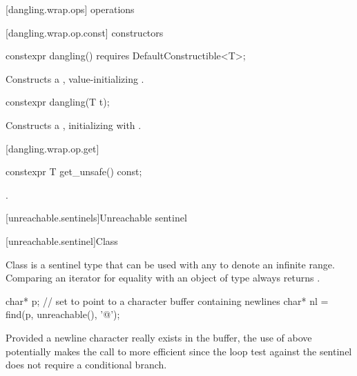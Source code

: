 [dangling.wrap.ops]{ operations}

[dangling.wrap.op.const]{ constructors}

%
\begin{itemdecl}
constexpr dangling() requires DefaultConstructible<T>;
\end{itemdecl}

\begin{itemdescr}
\pnum
\effects Constructs a , value-initializing .
\end{itemdescr}

%
\begin{itemdecl}
constexpr dangling(T t);
\end{itemdecl}

\begin{itemdescr}
\pnum
\effects Constructs a , initializing  with .
\end{itemdescr}

[dangling.wrap.op.get]{}

%
%
\begin{itemdecl}
constexpr T get_unsafe() const;
\end{itemdecl}

\begin{itemdescr}
\pnum
\returns {}.
\end{itemdescr}

[unreachable.sentinels]{Unreachable sentinel}

[unreachable.sentinel]{Class }

\pnum
{}%
Class  is a sentinel type that can be used with any
 to denote an infinite range. Comparing an iterator for equality with
an object of type  always returns .

\enterexample
\begin{codeblock}
char* p;
// set  to point to a character buffer containing newlines
char* nl = find(p, unreachable(), '@\textbackslash@n');
\end{codeblock}

Provided a newline character really exists in the buffer, the use of 
above potentially makes the call to  more efficient since the loop test against
the sentinel does not require a conditional branch.
\exitexample

